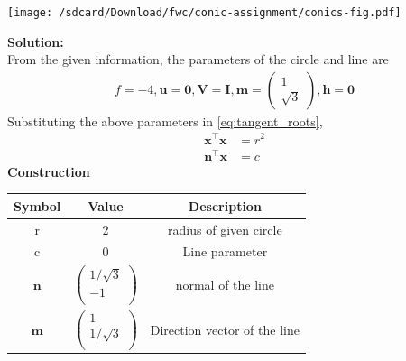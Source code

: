 \documentclass[10pt,a4paper]{report}
\newcommand{\myvec}[1]{\ensuremath{\begin{pmatrix}#1\end{pmatrix}}}
\let\vec\mathbf
\begin{document}
\begin{multicols}{2}
{\begin{center}
\texttt{[image: /sdcard/Download/fwc/conic-assignment/conics-fig.pdf]} 
\end{center}
	  \textbf{Solution:} \\
\vspace{0.25cm}
\fi
  From the given information, the parameters of the  circle and line are
                      \begin{align}
			      f= -4, \vec{u}=\vec{0}, \vec{V}=\vec{I}, \vec{m}=\myvec{1 \\ \sqrt{3}}, \vec{h} = \vec{0}
		\label{eq:12/8/1/6}
                    \end{align}                                                                              
Substituting		    the above parameters in  
\eqref{eq:tangent_roots},
\iffalse
		    \begin{align}                                                                             
		    \label{eq:cbse-2020-circ}                                                                 
		    \vec{x}^{\top}\vec{x} &= r^2               \\                                             
			    \vec{n}^{\top}\vec{x} &= c                                                         
\end{align}
	  \vspace{2mm}
\textbf{Construction}
 \vspace{0.2cm}
 \setlength\extrarowheight{2pt}
 \begin{tabular}{|c|c|c|}
         \hline
         \textbf{Symbol}&\textbf{Value}&\textbf{Description}\\
         \hline
         r & 2 & radius of given circle\\
         \hline
         c& 0 & Line parameter\\
         \hline
	 $\vec n$ & $\begin{pmatrix}1/\sqrt{3} \\ -1 \\ \end{pmatrix}$ & normal of the line\\
         \hline
	 $\vec m$ & $\begin{pmatrix}1 \\ 1/\sqrt{3} \\ \end{pmatrix}$ & Direction vector of the line\\
         \hline                                                                                          

\end{tabular}}
\end{multicols}
\end{document}

